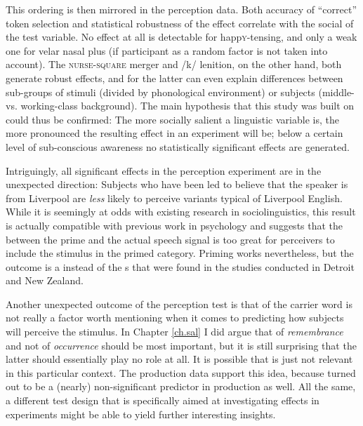 \newpage 
This ordering is then mirrored in the perception data.
Both accuracy of ``correct'' token selection and statistical robustness of the  effect correlate with the social  of the test variable.
No effect at all is detectable for happ\textsc{y}-tensing, and only a weak one for velar nasal plus (if participant as a random factor is not taken into account).
The \textsc{nurse}-\textsc{square} merger and /k/ lenition, on the other hand, both generate robust  effects, and for the latter  can even explain differences between sub-groups of stimuli (divided by phonological environment) or subjects (middle- vs. working-class background).
The main hypothesis that this study was built on could thus be confirmed: The more socially salient a linguistic variable is, the more pronounced the resulting effect in an   experiment will be; below a certain level of sub-conscious awareness no statistically significant  effects are generated.

Intriguingly, all significant effects in the perception experiment are in the unexpected direction: Subjects who have been led to believe that the speaker is from Liverpool are \emph{less} likely to perceive variants typical of Liverpool English.
While it is seemingly at odds with existing  research in sociolinguistics, this result is actually compatible with previous work in psychology and suggests that the  between the prime and the actual speech signal is too great for perceivers to include the stimulus in the primed category.
Priming works nevertheless, but the outcome is a  instead of the s that were found in the studies conducted in Detroit and New Zealand.

Another unexpected outcome of the perception test is that  of the carrier word is not really a factor worth mentioning when it comes to predicting how subjects will perceive the stimulus.
In Chapter \ref{ch.sal} I did argue that  of \emph{remembrance} and not  of \emph{occurrence} should be most important, but it is still surprising that the latter should essentially play no role at all.
It is possible that  is just not relevant in this particular context.
The production data support this idea, because  turned out to be a (nearly) non-significant predictor in production as well.
All the same, a different test design that is specifically aimed at investigating  effects in  experiments might be able to yield further interesting insights.

